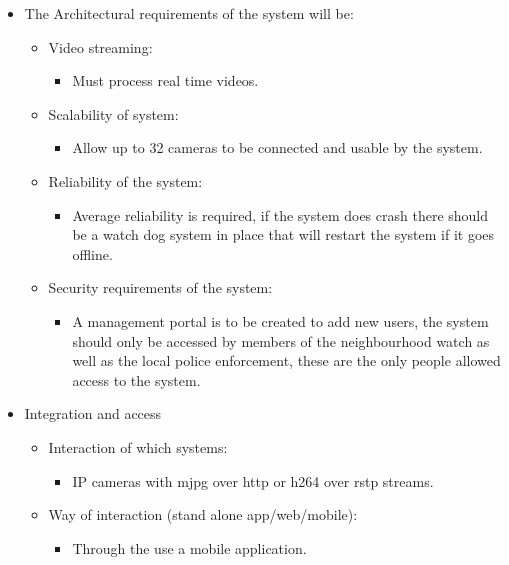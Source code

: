 \documentclass[letterpaper]{article}
\begin{document}
		\begin{itemize}
			\item The Architectural requirements of the system will be:
			\begin{itemize}
				\item	Video streaming:
				\begin{itemize}				
				\item	Must process real time videos.
				\end{itemize}
				
				\item	Scalability of system:
				\begin{itemize}
				\item	Allow up to 32 cameras to be connected and usable by the system.
				\end{itemize}
				
				\item	Reliability of the system:
				\begin{itemize}
				\item	Average reliability is required, if the system does crash there should be a watch dog system in place that will restart the system if it goes offline.
				\end{itemize}
				
				\item Security requirements of the system:
				\begin{itemize}
				\item A management portal is to be created to add new users, the system should only be accessed by members of the neighbourhood watch as well as the local police enforcement, these are the only people allowed access to the system.	
				\end{itemize}	
		\end{itemize}
		
		\item Integration and access
			\begin{itemize}
				\item	Interaction of which systems:
				\begin{itemize}				
				\item	IP cameras with mjpg over http or h264 over rstp streams.
				\end{itemize}
				
				\item	Way of interaction (stand alone app/web/mobile):
				\begin{itemize}
				\item	Through the use a mobile application.
				\end{itemize}	
				

\end{itemize}
\end{itemize}
\end{document}
